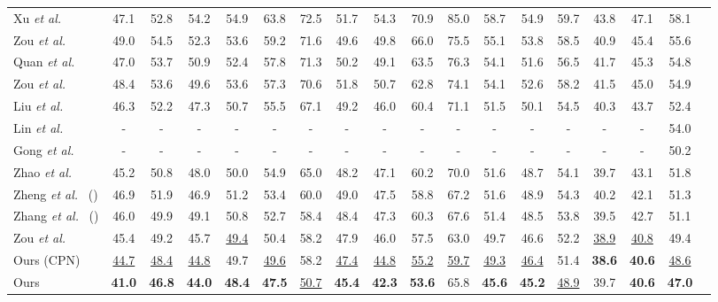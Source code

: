 \documentclass[10pt,journal]{IEEEtran}
\begin{document}
\begin{table*}[!htb]
\begin{tabular}{l*{17}{c}}
Xu \textit{et al.}~\cite{YuanluXu:2021} & 47.1 & 52.8 & 54.2 & 54.9 & 63.8 & 72.5 & 51.7 & 54.3 & 70.9 & 85.0 & 58.7 & 54.9 & 59.7 & 43.8 & 47.1 & 58.1\\
Zou \textit{et al.}~\cite{zou2020high} & 49.0& 54.5& 52.3& 53.6& 59.2 &71.6& 49.6& 49.8 &66.0 &75.5 &55.1 &53.8& 58.5& 40.9& 45.4 &55.6\\
Quan \textit{et al.}~\cite{quan2021higher} &47.0 & 53.7 & 50.9 & 52.4&57.8 &71.3&50.2 &49.1 &63.5 &76.3  &54.1&51.6 &56.5 &41.7 &45.3 &54.8 \\
Zou \textit{et al.}~\cite{zou2021compositional} & 48.4 &  53.6 &  49.6 &  53.6 &  57.3 &  70.6 &  51.8 &  50.7 &  62.8 &  74.1 &  54.1 &  52.6 &  58.2 &  41.5 &  45.0 &  54.9\\
Liu \textit{et al.}~\cite{liu2020comprehensive} & 46.3 & 52.2 & 47.3 & 50.7 & 55.5 & 67.1 & 49.2 & 46.0 & 60.4 & 71.1 & 51.5 & 50.1 & 54.5 & 40.3 & 43.7 & 52.4 \\
Lin \textit{et al.}~\cite{Kevin2021End} & - & - & - & - & - & - & - & - & - & - & - & - & - & - & - & 54.0 \\
Gong \textit{et al.}~\cite{Kehong2021PoseAug} & - & - & - & - & - & - & - & - & - & - & - & - & - & - & - & 50.2 \\
Zhao \textit{et al.}~\cite{Weixi2021GraFormer} & 45.2 & 50.8 & 48.0 & 50.0 & 54.9 & 65.0 & 48.2 & 47.1 & 60.2 & 70.0 & 51.6 & 48.7 & 54.1 & 39.7 & 43.1 & 51.8 \\
Zheng \textit{et al.}~\cite{PoseFormer:2021} () & 46.9 & 	51.9 & 	46.9 & 	51.2 & 	53.4 & 	60.0 & 	49.0 & 	47.5 & 	58.8 & 	67.2 & 	51.6 & 	48.9 & 	 54.3 & 	40.2 & 	 42.1 & 	51.3 \\
Zhang \textit{et al.}~\cite{Jinlu2022Mix} () & 46.0 & 49.9 &  49.1 & 	50.8 & 	52.7 & 	58.4 & 	48.4 & 	47.3 & 	60.3 & 	67.6 & 	51.4 & 	48.5 & 	53.8 & 	39.5 & 	 42.7 & 	 51.1 \\
Zou \textit{et al.}~\cite{zou2021modulated} & 45.4 & 49.2 & 45.7 & \underline{49.4} & 50.4 &  58.2 & 47.9 & 46.0 & 57.5 & 63.0 & 49.7 & 46.6 & 52.2 & \underline{38.9} & \underline{40.8} & 49.4\\
\midrule[.8pt]
Ours (CPN) & \underline{44.7} &	\underline{48.4} &	\underline{44.8} &	49.7 &	\underline{49.6} &	58.2 &	\underline{47.4} &	 \underline{44.8} &	 \underline{55.2} &	 \underline{59.7} &	\underline{49.3} &	\underline{46.4} &	51.4 &	\textbf{38.6} &	\textbf{40.6} &	 \underline{48.6} \\
Ours & \textbf{41.0} &	\textbf{46.8} &	\textbf{44.0} &	\textbf{48.4} &	\textbf{47.5} &	\underline{50.7} &	\textbf{45.4} &	\textbf{42.3} &	 \textbf{53.6} &	 65.8 &	 \textbf{45.6} & \textbf{45.2} & \underline{48.9} & 39.7 & \textbf{40.6} & \textbf{47.0} \\
			
\bottomrule[1pt]
\end{tabular}
\label{Tab:Result1}
\end{table*}
\end{document}
